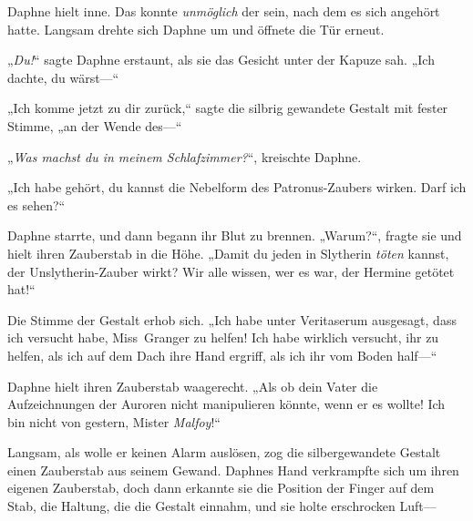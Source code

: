 Daphne hielt inne. Das konnte \emph{unmöglich} der sein, nach dem es sich angehört hatte. Langsam drehte sich Daphne um und öffnete die Tür erneut.

„\emph{Du!}“ sagte Daphne erstaunt, als sie das Gesicht unter der Kapuze sah. „Ich dachte, du wärst—“

„Ich komme jetzt zu dir zurück,“ sagte die silbrig gewandete Gestalt mit fester Stimme, „an der Wende des—“

„\emph{Was machst du in meinem Schlafzimmer?}“, kreischte Daphne.

„Ich habe gehört, du kannst die Nebelform des Patronus-Zaubers wirken. Darf ich es sehen?“

Daphne starrte, und dann begann ihr Blut zu brennen.
„Warum?“, fragte sie und hielt ihren Zauberstab in die Höhe. „Damit du jeden in Slytherin \emph{töten} kannst, der Unslytherin-Zauber wirkt? Wir alle wissen, wer es war, der Hermine getötet hat!“

Die Stimme der Gestalt erhob sich.
„Ich habe unter Veritaserum ausgesagt, dass ich versucht habe, Miss~Granger zu helfen! Ich habe wirklich versucht, ihr zu helfen, als ich auf dem Dach ihre Hand ergriff, als ich ihr vom Boden half—“

Daphne hielt ihren Zauberstab waagerecht.
„Als ob dein Vater die Aufzeichnungen der Auroren nicht manipulieren könnte, wenn er es wollte! Ich bin nicht von gestern, Mister \emph{Malfoy}!“

Langsam, als wolle er keinen Alarm auslösen, zog die silbergewandete Gestalt einen Zauberstab aus seinem Gewand. Daphnes Hand verkrampfte sich um ihren eigenen Zauberstab, doch dann erkannte sie die Position der Finger auf dem Stab, die Haltung, die die Gestalt einnahm, und sie holte erschrocken Luft—

